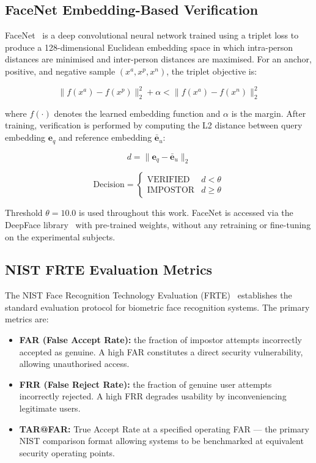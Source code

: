 \documentclass[conference]{IEEEtran}
\begin{document}
\subsection{FaceNet Embedding-Based Verification}

FaceNet~\cite{schroff2015facenet} is a deep convolutional neural network trained using a triplet loss to produce a 128-dimensional Euclidean embedding space in which intra-person distances are minimised and inter-person distances are maximised. For an anchor, positive, and negative sample $(x^a, x^p, x^n)$, the triplet objective is:

\begin{equation}
\|f(x^a) - f(x^p)\|_2^2 + \alpha < \|f(x^a) - f(x^n)\|_2^2
\end{equation}

where $f(\cdot)$ denotes the learned embedding function and $\alpha$ is the margin. After training, verification is performed by computing the L2 distance between query embedding $\mathbf{e}_q$ and reference embedding $\bar{\mathbf{e}}_u$:

\begin{equation}
d = \|\mathbf{e}_q - \bar{\mathbf{e}}_u\|_2
\end{equation}

\begin{equation}
\text{Decision} = \begin{cases} \text{VERIFIED} & d < \theta \\ \text{IMPOSTOR} & d \geq \theta \end{cases}
\end{equation}

Threshold $\theta = 10.0$ is used throughout this work. FaceNet is accessed via the DeepFace library~\cite{serengil2020deepface} with pre-trained weights, without any retraining or fine-tuning on the experimental subjects.

\subsection{NIST FRTE Evaluation Metrics}

The NIST Face Recognition Technology Evaluation (FRTE)~\cite{nist_frte} establishes the standard evaluation protocol for biometric face recognition systems. The primary metrics are:

\begin{itemize}
    \item \textbf{FAR (False Accept Rate):} the fraction of impostor attempts incorrectly accepted as genuine. A high FAR constitutes a direct security vulnerability, allowing unauthorised access.
    \item \textbf{FRR (False Reject Rate):} the fraction of genuine user attempts incorrectly rejected. A high FRR degrades usability by inconveniencing legitimate users.
    \item \textbf{TAR@FAR:} True Accept Rate at a specified operating FAR — the primary NIST comparison format allowing systems to be benchmarked at equivalent security operating points.
\end{itemize}
\end{document}
